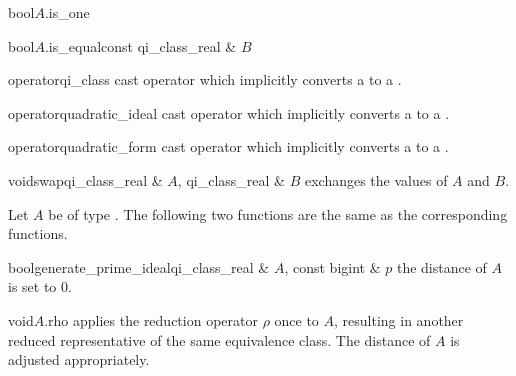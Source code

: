 \begin{cfcode}{bool}{$A$.is_one}{}
\end{cfcode}

\begin{cfcode}{bool}{$A$.is_equal}{const qi_class_real & $B$}
\end{cfcode}



\BASIC

\begin{cfcode}{operator}{qi_class}{}
  cast operator which implicitly converts a  to a .
\end{cfcode}

\begin{cfcode}{operator}{quadratic_ideal}{}
  cast operator which implicitly converts a  to a .
\end{cfcode}

\begin{cfcode}{operator}{quadratic_form}{}
  cast operator which implicitly converts a  to a .
\end{cfcode}

\begin{fcode}{void}{swap}{qi_class_real & $A$, qi_class_real & $B$}
  exchanges the values of $A$ and $B$.
\end{fcode}



\HIGH

Let $A$ be of type .  The following two functions are the same as the
corresponding  functions.

\begin{fcode}{bool}{generate_prime_ideal}{qi_class_real & $A$, const bigint & $p$}
  the distance of $A$ is set to $0$.
\end{fcode}




\begin{fcode}{void}{$A$.rho}{}
  applies the reduction operator $\rho$ once to $A$, resulting in another reduced representative
  of the same equivalence class.  The distance of $A$ is adjusted appropriately.
\end{fcode}


